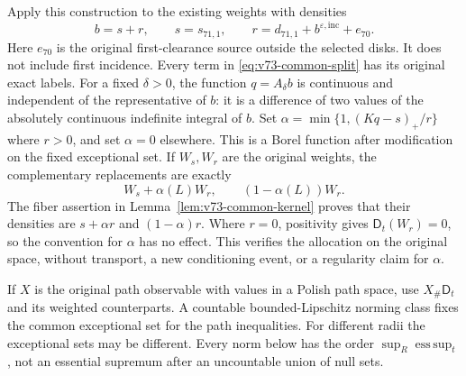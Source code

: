 Apply this construction to the existing weights with densities
\begin{equation}\label{eq:v73-common-split}
 b=s+r,\qquad s=s_{71,1},\qquad
 r=d_{71,1}+b^{\varepsilon,\mathrm{inc}}+e_{70}.
\end{equation}
Here $e_{70}$ is the original first-clearance source outside the
selected disks. It does not include first incidence. Every term in
\eqref{eq:v73-common-split} has its original exact labels. For a
fixed $\delta>0$, the function $q=A_\delta b$ is continuous and
independent of the representative of $b$: it is a difference of two
values of the absolutely continuous indefinite integral of $b$.
Set $\alpha=\min\{1,(Kq-s)_+/r\}$ where $r>0$, and set
$\alpha=0$ elsewhere. This is a Borel function after modification
on the fixed exceptional set. If $W_s,W_r$ are the original weights,
the complementary replacements are exactly
\begin{equation}\label{eq:v73-common-allocation-weights}
 W_s+\alpha(L)W_r,\qquad (1-\alpha(L))W_r.
\end{equation}
The fiber assertion in Lemma~\ref{lem:v73-common-kernel} proves that
their densities are $s+\alpha r$ and $(1-\alpha)r$. Where $r=0$,
positivity gives $\mathsf D_t(W_r)=0$, so the convention for $\alpha$
has no effect. This verifies the allocation on the original space,
without transport, a new conditioning event, or a regularity claim
for $\alpha$.

If $X$ is the original path observable with values in a Polish path
space, use $X_\#\mathsf D_t$ and its weighted counterparts. A
countable bounded-Lipschitz norming class fixes the common exceptional
set for the path inequalities. For different radii the exceptional
sets may be different. Every norm below has the order
$\sup_R\operatorname*{ess\,sup}_t$, not an essential supremum after
an uncountable union of null sets.

